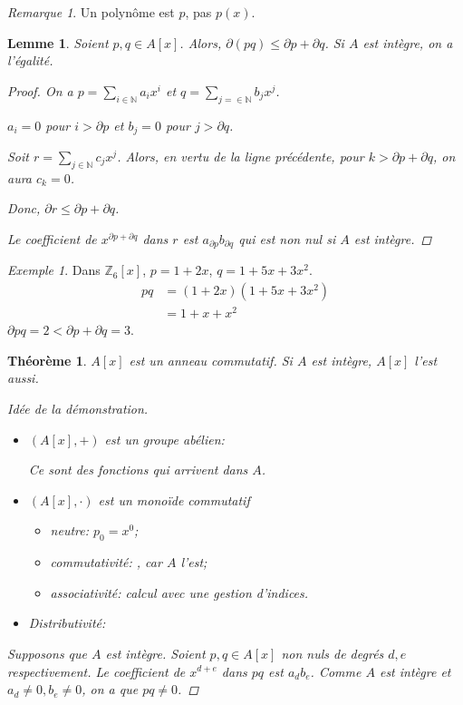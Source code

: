 \documentclass{report}
\newtheorem*{thm}{Th\'eor\`eme}
\newtheorem*{lem}{Lemme}
\theoremstyle{definition}
\theoremstyle{remark}
\newtheorem*{exem}{Exemple}
\newtheorem*{rmq}{Remarque}
\newenvironment*{subproof}[1][D\'emonstration]
{
\begin{proof}[#1]

}
{
\renewcommand{\qedsymbol}{$\blacksquare$}
\end{proof}
\renewcommand{\qedsymbol}{$\square$}
}
\def\lte{\leqslant}
\def\NN{\mathbb{N}}
\def\ZZ{\mathbb{Z}}
\begin{document}
	\begin{rmq}
		Un polyn\^ome est $p$, pas $p(x)$.
	\end{rmq}

	\begin{lem}
		Soient $p,q\in A[x]$. Alors, $\partial(pq) \lte \partial p+\partial q$. Si $A$ est int\`egre, on a l'\'egalit\'e.

		\begin{proof}
			On a $p=\sum_{i\in\NN}a_ix^i$ et $q=\sum_{j=\in\NN}b_jx^j$.

			$a_i=0$ pour $i>\partial p$ et $b_j=0$ pour $j>\partial q$.

			Soit $r=\sum_{j\in\NN}c_jx^j$. Alors, en vertu de la ligne pr\'ec\'edente, pour $k>\partial p+\partial q$, on aura $c_k=0$.

			Donc, $\partial r \lte \partial p+\partial q$.

			Le coefficient de $x^{\partial p+\partial q}$ dans $r$ est $a_{\partial p}b_{\partial q}$ qui est non nul si $A$ est int\`egre.
		\end{proof}
	\end{lem}

	\begin{exem}
		Dans $\ZZ_6[x]$, $p=1+2x$, $q=1+5x+3x^2$.
		\begin{align*}
			pq&= (1+2x)(1+5x+3x^2)\\
			&= 1+x+x^2
		\end{align*}
		$\partial pq=2<\partial p+\partial q=3$.
	\end{exem}

	\begin{thm}
		$A[x]$ est un anneau commutatif. Si $A$ est int\`egre, $A[x]$ l'est aussi.

		\begin{subproof}[Id\'ee de la d\'emonstration]~

			\begin{itemize}
				\item $(A[x],+)$ est un groupe ab\'elien: \checkmark

				Ce sont des fonctions qui arrivent dans $A$.
				\item $(A[x],\cdot)$ est un mono\"ide commutatif
				\begin{itemize}
					\item neutre: $p_0=x^0$;
					\item commutativit\'e: \checkmark, car $A$ l'est;
					\item associativit\'e: calcul avec une gestion d'indices.
				\end{itemize}
				\item Distributivit\'e: \checkmark
			\end{itemize}

			Supposons que $A$ est int\`egre. Soient $p,q\in A[x]$ non nuls de degr\'es $d,e$ respectivement. Le coefficient de $x^{d+e}$ dans $pq$ est $a_db_e$. Comme $A$ est int\`egre et $a_d\neq0,b_e\neq0$, on a que $pq\neq0$.
		\end{subproof}
	\end{thm}
\end{document}
